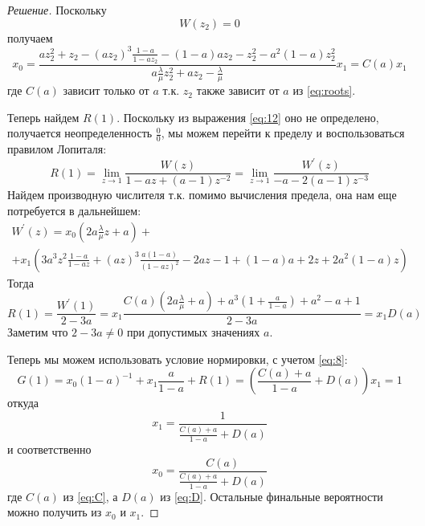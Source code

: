 \documentclass[12pt,a4paper]{article}
\begin{document}
\begin{proof}[Решение]
	Поскольку
	$$W(z_2) = 0$$
	получаем
	\begin{equation}\label{eq:C}
		x_0 = \frac{az_2^2 + z_2 - (az_2)^3 \tfrac{1-a}{1-az_2} - (1-a)az_2 - z_2^2 - a^2 (1-a)z_2^2}{a \frac{\lambda}{\mu} z_2^2 + a z_2 - \frac{\lambda}{\mu}} x_1 = C(a) x_1
	\end{equation}
	где $C(a)$ зависит только от $a$ т.к. $z_2$ также зависит от $a$ из \eqref{eq:roots}.
	
	Теперь найдем $R(1)$. Поскольку из выражения \eqref{eq:12} оно не определено, получается неопределенность $\frac{0}{0}$, мы можем перейти к пределу и воспользоваться правилом Лопиталя:
	\begin{equation*}
		R(1) = \lim_{z \to 1}{\frac{W(z)}{1 - az + (a-1)z^{-2}}} = \lim_{z \to 1}{\frac{W^\prime(z)}{-a - 2(a-1)z^{-3}}}
	\end{equation*}
	Найдем производную числителя т.к. помимо вычисления предела, она нам еще потребуется в дальнейшем:
	\begin{multline*}
		W^\prime (z) = x_0 \left(2 a \frac{\lambda}{\mu} z + a\right) + \\ 
		+ x_1 \left(3a^3 z^2 \frac{1-a}{1-az} + (az)^3 \frac{a(1-a)}{(1-az)^2} - 2az - 1 + (1 - a)a + 2z + 2a^2 (1 - a) z \right)
	\end{multline*}
	Тогда
	\begin{equation}\label{eq:D}
		R(1) = \frac{W^\prime (1)}{2 - 3a} = x_1 \frac{C(a)\left(2a\frac{\lambda}{\mu} + a\right) + a^3 \left(1 + \frac{a}{1-a}\right) + a^2 - a +1}{2 - 3a} = x_1 D(a)
	\end{equation}
	Заметим что $2 - 3a \neq 0$ при допустимых значениях $a$.
	
	Теперь мы можем использовать условие нормировки, с учетом \eqref{eq:8}:
	\begin{equation*}
		G(1) = x_0 (1 - a)^{-1} + x_1 \frac{a}{1-a} + R(1) = \left( \frac{C(a) + a}{1-a} + D(a)\right) x_1 = 1
	\end{equation*}
	откуда
	\begin{equation}
		x_1 = \frac{1}{\frac{C(a) + a}{1-a} + D(a)}
	\end{equation}
	и соответственно
	\begin{equation}
		x_0 = \frac{C(a)}{\frac{C(a) + a}{1-a} + D(a)}
	\end{equation}
	где $C(a)$ из \eqref{eq:C}, а $D(a)$ из \eqref{eq:D}. Остальные финальные вероятности можно получить из $x_0$ и $x_1$.
	

\end{proof}
\end{document}
